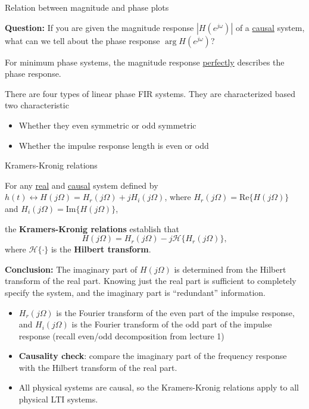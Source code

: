 \documentclass[10pt]{beamer}
\begin{document}
\begin{frame}{Relation between magnitude and phase plots}

\textbf{Question:} If you are given the magnitude response $|H(e^{j\omega})|$ of a \underline{causal} system, what can we tell about the phase response $\arg H(e^{j\omega})$?

\vspace{5mm}
\pause
For minimum phase systems, the magnitude response \underline{perfectly} describes the phase response.

There are four types of linear phase FIR systems. They are characterized based two characteristic
\begin{itemize}
	\item Whether they even symmetric or odd symmetric
	\item Whether the impulse response length is even or odd
\end{itemize}

\end{frame}

\begin{frame}{Kramers-Kronig relations}

For any \underline{real} and \underline{causal} system defined by $h(t) \leftrightarrow H(j\Omega) = H_r(j\Omega) + jH_i(j\Omega)$, where $H_r(j\Omega) = \mathrm{Re}\{H(j\Omega)\}$ and $H_i(j\Omega) = \mathrm{Im}\{H(j\Omega)\}$,

the \textbf{Kramers-Kronig relations} establish that
\begin{equation*}
H(j\Omega) = H_r(j\Omega) - j\mathcal{H}\{H_r(j\Omega)\},
\end{equation*}
where $\mathcal{H}\{\cdot\}$ is the \textbf{Hilbert transform}.

\pause
\textbf{Conclusion:} The imaginary part of $H(j\Omega)$ is determined from the Hilbert transform of the real part. Knowing just the real part is sufficient to completely specify the system, and the imaginary part is ``redundant'' information.

\pause
\begin{itemize}
	\item $H_r(j\Omega)$ is the Fourier transform of the even part of the impulse response, and  $H_i(j\Omega)$ is the Fourier transform of the odd part of the impulse response (recall even/odd decomposition from lecture 1)
	\item \textbf{Causality check}: compare the imaginary part of the frequency response with the Hilbert transform of the real part.
	\item All physical systems are causal, so the Kramers-Kronig relations apply to all physical LTI systems.
\end{itemize}
\end{frame}
\end{document}
